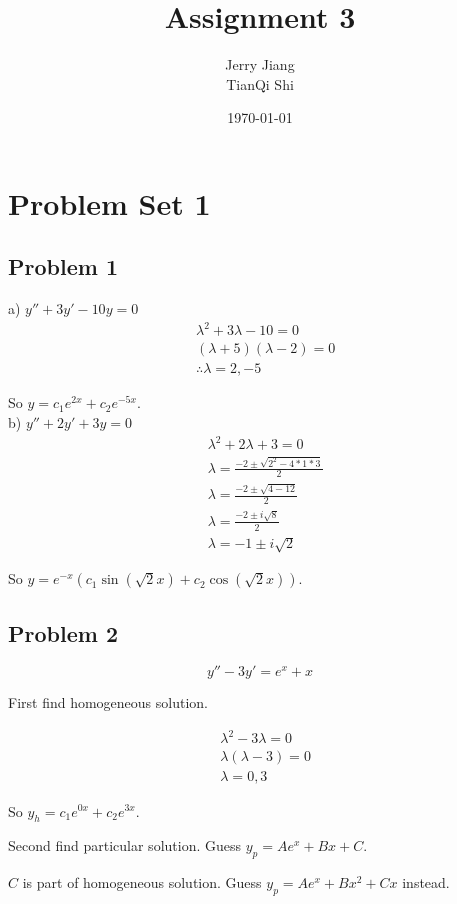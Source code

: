 \documentclass[titlepage]{article}
\title{Assignment 3}
\date{\today}
\author{Jerry Jiang\\ TianQi Shi}
\begin{document}
\maketitle

\noindent
\section{Problem Set 1}
\subsection{Problem 1}
a) $y'' + 3y' - 10y = 0$
\begin{align*}
    &\lambda ^2 + 3 \lambda - 10 = 0
 \\ &(\lambda + 5)(\lambda -  2) = 0
 \\ &\therefore \lambda = 2, -5
\end{align*}

\noindent So $y = c_1 e^{2x} + c_2 e^{-5x}$.\\

\noindent b) $y'' + 2y' + 3y = 0$
\begin{align*}
    &\lambda ^2 + 2 \lambda + 3 = 0
 \\ &\lambda = \frac{-2 \pm \sqrt{2^2 - 4 * 1 * 3}}{2}
 \\ &\lambda = \frac{-2 \pm \sqrt{4 - 12}}{2}
 \\ &\lambda = \frac{-2 \pm i\sqrt{8}}{2}
 \\ &\lambda = -1 \pm i\sqrt{2}
\end{align*}

\noindent So $y = e^{-x}(c_1 \sin(\sqrt{2}x) + c_2 \cos(\sqrt{2}x))$.

\subsection{Problem 2}
$$y'' - 3y' = e^x + x$$

\noindent First find homogeneous solution.

\begin{align*}
    &\lambda^2 - 3\lambda = 0
 \\ &\lambda (\lambda - 3) = 0
 \\ &\lambda = 0, 3
\end{align*}

\noindent So $y_h = c_1e^{0x} + c_2e^{3x}$.

\noindent Second find particular solution. Guess $y_p = Ae^x + Bx + C$.

\noindent $C$ is part of homogeneous solution. Guess $y_p = Ae^x + Bx^2 + Cx$ instead.
\end{document}
